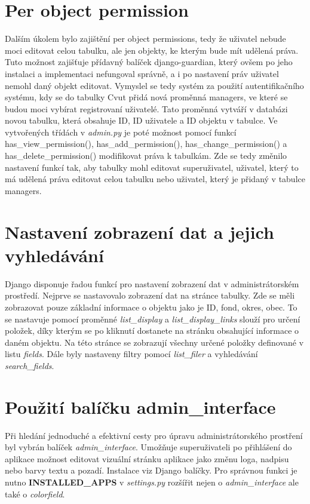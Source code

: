 \section{Per object permission}

Dalším úkolem bylo zajištění per object permissions, tedy že uživatel nebude moci editovat celou tabulku, ale jen objekty, ke kterým bude mít udělená práva. Tuto možnost zajišťuje přídavný balíček django-guardian, který ovšem po jeho instalaci a implementaci nefungoval správně, a i po nastavení práv uživatel nemohl daný objekt editovat. Vymyslel se tedy systém za použití autentifikačního systému, kdy se do tabulky Cvut přidá nová proměnná managers, ve které se budou moci vybírat registrovaní uživatelé. Tato proměnná vytváří v databázi novou tabulku, která obsahuje ID, ID uživatele a ID objektu v tabulce. Ve vytvořených třídách v \emph{admin.py} je poté možnost pomocí funkcí has_view_permission(), has_add_permission(), has_change_permission() a has_delete_permission() modifikovat práva k tabulkám. Zde se tedy změnilo nastavení funkcí tak, aby tabulky mohl editovat superuživatel, uživatel, který to má udělená práva editovat celou tabulku nebo uživatel, který je přidaný v tabulce managers. 


\section{Nastavení zobrazení dat a jejich vyhledávání}

Django disponuje řadou funkcí pro nastavení zobrazení dat v administrátorském prostředí. Nejprve se nastavovalo zobrazení dat na stránce tabulky. Zde se měli zobrazovat pouze základní informace o objektu jako je ID, fond, okres, obec. To se nastavuje pomocí proměnné \emph{list\_display} a \emph{list\_display\_links} slouží pro určení položek, díky kterým se po kliknutí dostanete na stránku obsahující informace o daném objektu. Na této stránce se zobrazují všechny určené položky definované v listu \emph{fields}. Dále byly nastaveny filtry pomocí \emph{list\_filer} a vyhledávání \emph{search\_fields}. 


\section{Použití balíčku admin\_interface}

Při hledání jednoduché a efektivní cesty pro úpravu administrátorského prostření byl vybrán balíček \emph{admin_interface}. Umožňuje superuživateli po přihlášení do aplikace možnost editovat vizuální stránku aplikace jako změnu loga, nadpisu nebo barvy textu a pozadí. Instalace viz Django balíčky. Pro správnou funkci je nutno \textbf{INSTALLED\_APPS} v \emph{settings.py} rozšířit nejen o \emph{admin\_interface} ale také o \emph{colorfield}.



